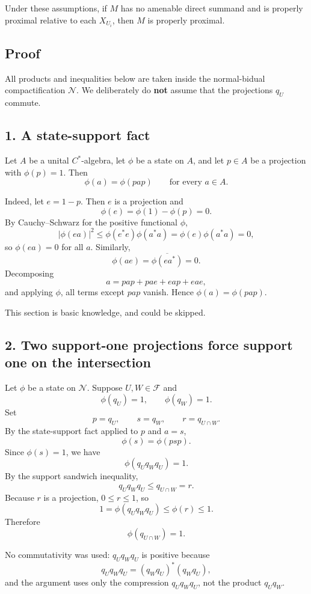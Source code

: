 \documentclass[12pt]{article}
\newcommand{\review}[1]{\begin{reviewbox}#1\end{reviewbox}}
\begin{document}
Under these assumptions, if \(M\) has no amenable direct summand and is properly proximal relative to each \(X_{U_i}\), then \(M\) is properly proximal.

\subsection*{Proof}

All products and inequalities below are taken inside the normal-bidual compactification \(\mathcal N\). We deliberately do \textbf{not} assume that the projections \(q_U\) commute.

\subsection*{1. A state-support fact}

Let \(A\) be a unital \(C^*\)-algebra, let \(\phi\) be a state on \(A\), and let \(p\in A\) be a projection with \(\phi(p)=1\). Then
\[
\phi(a)=\phi(pap)
\qquad\text{for every }a\in A.
\]

Indeed, let \(e=1-p\). Then \(e\) is a projection and
\[
\phi(e)=\phi(1)-\phi(p)=0.
\]
By Cauchy–Schwarz for the positive functional \(\phi\),
\[
|\phi(ea)|^2\le \phi(e^*e)\phi(a^*a)=\phi(e)\phi(a^*a)=0,
\]
so \(\phi(ea)=0\) for all \(a\). Similarly,
\[
\phi(ae)=\overline{\phi(ea^*)}=0.
\]
Decomposing
\[
a=pap+pae+eap+eae,
\]
and applying \(\phi\), all terms except \(pap\) vanish. Hence \(\phi(a)=\phi(pap)\).

\review{This section is basic knowledge, and could be skipped.}

\subsection*{2. Two support-one projections force support one on the intersection}

Let \(\phi\) be a state on \(\mathcal N\). Suppose \(U,W\in\mathcal F\) and
\[
\phi(q_U)=1,\qquad \phi(q_W)=1.
\]
Set
\[
p=q_U,\qquad s=q_W,\qquad r=q_{U\cap W}.
\]
By the state-support fact applied to \(p\) and \(a=s\),
\[
\phi(s)=\phi(psp).
\]
Since \(\phi(s)=1\), we have
\[
\phi(q_Uq_Wq_U)=1.
\]
By the support sandwich inequality,
\[
q_Uq_Wq_U\le q_{U\cap W}=r.
\]
Because \(r\) is a projection, \(0\le r\le 1\), so
\[
1=\phi(q_Uq_Wq_U)\le \phi(r)\le 1.
\]
Therefore
\[
\phi(q_{U\cap W})=1.
\]

No commutativity was used: \(q_Uq_Wq_U\) is positive because
\[
q_Uq_Wq_U=(q_Wq_U)^*(q_Wq_U),
\]
and the argument uses only the compression \(q_Uq_Wq_U\), not the product \(q_Uq_W\).
\end{document}
